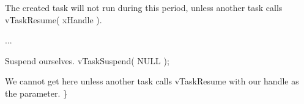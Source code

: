 \begin{DoxyPre}The created task will not run during this period, unless
another task calls vTaskResume( xHandle ).\end{DoxyPre}



\begin{DoxyPre}...\end{DoxyPre}



\begin{DoxyPre}Suspend ourselves.
         vTaskSuspend( NULL );\end{DoxyPre}



\begin{DoxyPre}We cannot get here unless another task calls vTaskResume
with our handle as the parameter.
 \}
   \end{DoxyPre}
 